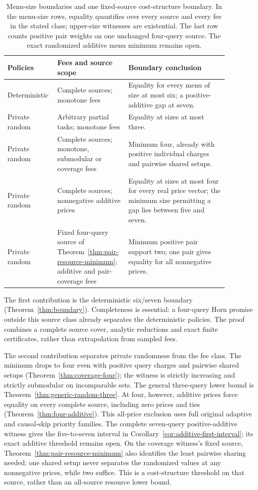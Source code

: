 \documentclass[pdflatex,sn-mathphys-num]{sn-jnl}
\theoremstyle{thmstyleone}
\theoremstyle{thmstylethree}
\theoremstyle{thmstyletwo}
\begin{document}
\begin{table}[ht]
\centering\small
\begin{tabular}{@{}p{0.18\linewidth}p{0.27\linewidth}p{0.43\linewidth}@{}}
\toprule
Policies & Fees and source scope & Boundary conclusion\\
\midrule
Deterministic & Complete sources; monotone fees
& Equality for every menu of size at most six; a positive-additive gap at seven.\\[3pt]
Private random & Arbitrary partial tasks; monotone fees
& Equality at sizes at most three.\\[3pt]
Private random & Complete sources; monotone, submodular or coverage fees
& Minimum four, already with positive individual charges and pairwise shared setups.\\[3pt]
Private random & Complete sources; nonnegative additive prices
& Equality at sizes at most four for every real price vector; the minimum size permitting a gap lies between five and seven.\\[3pt]
Private random & Fixed four-query source of Theorem~\ref{thm:pair-resource-minimum}; additive and pair-coverage fees
& Minimum positive pair support two; one pair gives equality for all nonnegative prices.\\
\bottomrule
\end{tabular}
\caption{Menu-size boundaries and one fixed-source cost-structure boundary.
In the menu-size rows, equality quantifies over every source and every fee
in the stated class; upper-size witnesses are existential. The last row
counts positive pair weights on one unchanged four-query source. The exact
randomized additive menu minimum remains open.}
\label{tab:core-boundaries}
\end{table}

The first contribution is the deterministic six/seven boundary
(Theorem~\ref{thm:boundary}). Completeness is essential: a four-query Horn
promise outside this source class already separates the deterministic
policies. The proof combines a complete source cover, analytic reductions
and exact finite certificates, rather than extrapolation from sampled fees.

The second contribution separates private randomness from the fee class.
The minimum drops to four even with positive query charges and pairwise
shared setups (Theorem~\ref{thm:coverage-four}); the witness is strictly
increasing and strictly submodular on incomparable sets. The general
three-query lower bound is Theorem~\ref{thm:generic-random-three}.
At four, however, additive prices force equality on every complete source,
including zero prices and ties (Theorem~\ref{thm:four-additive}). This
all-price exclusion uses full original adaptive and causal-skip priority
families. The complete seven-query positive-additive witness gives the
five-to-seven interval in Corollary~\ref{cor:additive-first-interval};
its exact additive threshold remains open.
On the coverage witness's fixed source, Theorem~\ref{thm:pair-resource-minimum}
also identifies the least pairwise sharing needed: one shared setup never
separates the randomized values at any nonnegative prices, while two
suffice. This is a cost-structure threshold on that source, rather than
an all-source resource lower bound.
\end{document}
